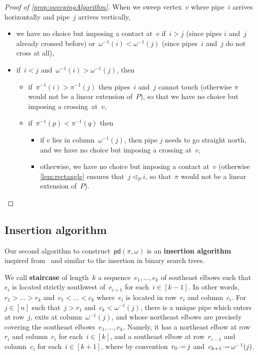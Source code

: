 \documentclass[reqno]{amsart}
\theoremstyle{definition}
\newcommand{\eqdef}{\mbox{\,\raisebox{0.2ex}{\scriptsize\ensuremath{\mathrm:}}\ensuremath{=}\,}} %
\newcommand{\defn}[1]{\textbf{\textsf{\color{PineGreen} #1}}} %
\newcommand{\insertion}[2]{\mathsf{pd}(#1,#2)} %
\newcommand{\less}{\vartriangleleft} %
\newcommand{\contactLess}[1]{\less_{#1}} %
\begin{document}
\begin{proof}[Proof of \cref{prop:sweepingAlgorithm}]
When we sweep vertex~$v$ where pipe~$i$ arrives horizontally and pipe~$j$ arrives vertically,
\begin{itemize}
\item we have no choice but imposing a contact at~$v$ if~$i > j$ (since pipes $i$ and~$j$ already crossed before) or~$\omega^{-1}(i) < \omega^{-1}(j)$ (since pipes~$i$ and~$j$ do not cross at all),
\item if~$i < j$ and~$\omega^{-1}(i) > \omega^{-1}(j)$, then
\begin{itemize}
\item if~$\pi^{-1}(i) > \pi^{-1}(j)$ then pipes~$i$ and~$j$ cannot touch (otherwise $\pi$ would not be a linear extension of~$P$), so that we have no choice but imposing a crossing~at~$v$,
\item if~$\pi^{-1}(p) < \pi^{-1}(q)$ then
	\begin{itemize}
	\item if $v$ lies in column~$\omega^{-1}(j)$, then pipe $j$ needs to go straight north, and we have no choice but imposing a crossing at~$v$,
	\item otherwise, we have no choice but imposing a contact at~$v$ (otherwise \cref{lem:rectangle} ensures that~$j \contactLess{P} i$, so that~$\pi$ would not be a linear extension of~$P$).
	\qedhere
	\end{itemize}
\end{itemize}
\end{itemize}
\end{proof}


\subsection{Insertion algorithm}
\label{subsec:insertionAlgorithm}

Our second algorithm to construct~$\insertion{\pi}{\omega}$ is an \defn{insertion algorithm} inspired from~\cite{Pilaud-brickAlgebra} and similar to the insertion in binary search trees.

We call \defn{staircase} of length~$k$ a sequence~$e_1, \dots, e_k$ of southeast elbows such that~$e_i$ is located strictly southwest of~$e_{i+1}$ for each~$i \in [k-1]$. In other words, $r_1 > \dots > r_k$ and~$c_1 < \dots < c_k$ where~$e_i$ is located in row~$r_i$ and column~$c_i$.
For~$j \in [n]$ such that~$j > r_1$ and~$c_k < \omega^{-1}(j)$, there is a unique pipe which enters at row~$j$, exits at column~$\omega^{-1}(j)$, and whose northeast elbows are precisely covering the southeast elbows~$e_1, \dots, e_k$.
Namely, it has a northeast elbow at row~$r_i$ and column~$c_i$ for each~$i \in [k]$, and a southeast elbow at row~$r_{i-1}$ and column~$c_i$ for each~$i \in [k+1]$, where by convention~$r_0 \eqdef j$ and~$c_{k+1} \eqdef \omega^{-1}(j)$.
\end{document}

